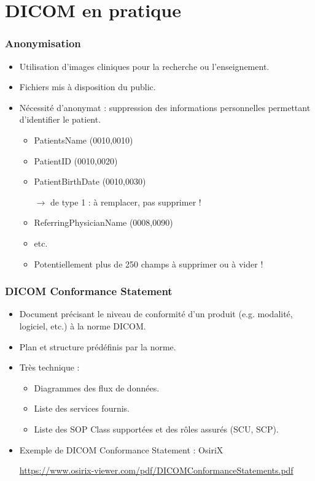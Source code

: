 \section{DICOM en pratique}

\frame
{
	\frametitle{Anonymisation}
	\begin{itemize}
		\item Utilisation d'images cliniques pour la recherche ou l'enseignement.
		\item Fichiers mis \`a disposition du public.
		\item N\'ecessit\'e d'anonymat : suppression des informations personnelles permettant d'identifier le patient.
		\begin{itemize}
			\item PatientsName (0010,0010)
			\item PatientID (0010,0020)
			\item PatientBirthDate (0010,0030)
			
			$\rightarrow$ de type 1 : \`a remplacer, pas supprimer !
			\item ReferringPhysicianName (0008,0090)
			\item etc.
			\item Potentiellement plus de 250 champs \`a supprimer ou \`a vider !
		\end{itemize}
	\end{itemize}
}

\frame
{
	\frametitle{DICOM Conformance Statement}
	\begin{itemize}
		\item Document pr\'ecisant le niveau de conformit\'e d'un produit (e.g. modalit\'e, logiciel, etc.) \`a la norme DICOM.
		\item Plan et structure pr\'ed\'efinis par la norme.
		\item Tr\`es technique :
		\begin{itemize}
			\item Diagrammes des flux de donn\'ees.
			\item Liste des services fournis.
			\item Liste des SOP Class support\'ees et des r\^oles assur\'es (SCU, SCP).
		\end{itemize}
		\item Exemple de DICOM Conformance Statement : OsiriX
		
		\url{https://www.osirix-viewer.com/pdf/DICOMConformanceStatements.pdf}
	\end{itemize}
}

